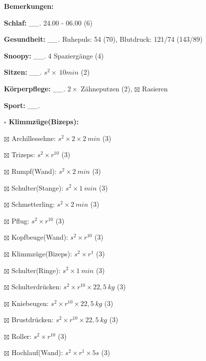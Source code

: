 \documentclass[10pt,a4paper]{article}
\newcommand\prop[1] {{\color {alizarin} {\bf #1}}}             %
\newcommand\mand[1] {{\color {burntorange} {\bf #1}}}          %
\newcommand\topspace{\vskip -15pt \hskip 20pt}
\newcommand\n[1] { {\sl #1.} \hskip 5pt }
\begin{document}
\begin{mdframed}[style=daystyle]
  \begin{labeling}{{\mand {Bemerkungen:}}}
    \setlength\itemsep{-3pt}
  \item[{\mand {Schlaf:}}]        \n{\_\_} 24.00 - 06.00 (6)
  \item[{\mand {Gesundheit:}}]    \n{\_\_} Ruhepuls: 54 (70), Blutdruck: 121/74 (143/89)
  \item[{\mand {Snoopy:}}]        \n{\_\_} 4 Spaziergänge (4)
  \item[{\mand {Sitzen:}}]        \n{\_\_} $s^2 \times\ 10 min$ (2)
  \item[{\mand {Körperpflege:}}]  \n{\_\_} $2 \times$ Zähneputzen (2), $\boxtimes$ Rasieren
  \item[{\mand {Sport:}}]         \n{\_\_}
    \topspace
    \begin{minipage}{0.75\textwidth}  
      \begin{labeling}{\prop {$\square$ {Klimmzüge(Bizeps):}}}
        \setlength\itemsep{-3pt}
      \item[$\boxtimes$ Archillessehne:]    $s^2 \times 2 \times 2\ min$ (3)
      \item[$\boxtimes$ Trizeps:]           $s^2 \times r^{10}$ (3)
      \item[$\boxtimes$ Rumpf(Wand):]       $s^2 \times 2\ min$ (3)
      \item[$\boxtimes$ Schulter(Stange):]  $s^2 \times 1\ min$ (3)
      \item[$\boxtimes$ Schmetterling:]     $s^2 \times 2\ min$ (3)
      \item[$\boxtimes$ Pflug:]             $s^2 \times r^{10}$ (3)
      \item[$\boxtimes$ Kopfbeuge(Wand):]   $s^2 \times r^{10}$ (3)
      \item[$\boxtimes$ Klimmzüge(Bizeps):] $s^2 \times r^1$ (3)
      \item[$\boxtimes$ Schulter(Ringe):]   $s^2 \times 1\ min$ (3)
      \item[$\boxtimes$ Schulterdrücken:]   $s^2 \times r^{10} \times 22,5\ kg$ (3)
      \item[$\boxtimes$ Kniebeugen:]        $s^2 \times r^{10} \times 22,5\ kg$ (3)
      \item[$\boxtimes$ Brustdrücken:]      $s^2 \times r^{10} \times 22,5\ kg$ (3)
      \item[$\boxtimes$ Roller:]            $s^2 \times r^{10}$ (3)
      \item[$\boxtimes$ Hochlauf(Wand):]    $s^2 \times r^{1} \times 5s$ (3)

\end{labeling}
\end{minipage}
\end{labeling}
\end{mdframed}
\end{document}
